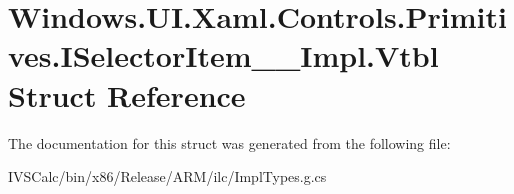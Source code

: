 \hypertarget{struct_windows_1_1_u_i_1_1_xaml_1_1_controls_1_1_primitives_1_1_i_selector_item_____impl_1_1_vtbl}{}\section{Windows.\+U\+I.\+Xaml.\+Controls.\+Primitives.\+I\+Selector\+Item\+\_\+\+\_\+\+Impl.\+Vtbl Struct Reference}
\label{struct_windows_1_1_u_i_1_1_xaml_1_1_controls_1_1_primitives_1_1_i_selector_item_____impl_1_1_vtbl}


The documentation for this struct was generated from the following file\+:\begin{DoxyCompactItemize}
\item 
I\+V\+S\+Calc/bin/x86/\+Release/\+A\+R\+M/ilc/Impl\+Types.\+g.\+cs\end{DoxyCompactItemize}
